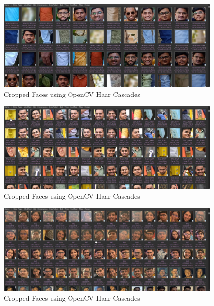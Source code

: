\documentclass[openany]{report}
\begin{document}
\begin{figure}[H]
    \centering
    \includegraphics[width=.95\textwidth]{imgs/Cropped images.png}
    \caption{Cropped Faces using OpenCV Haar Cascades}
\end{figure}

\begin{figure}[H]
    \centering
    \includegraphics[width=.95\textwidth]{imgs/Copped images 2.png}
    \caption{Cropped Faces using OpenCV Haar Cascades}
\end{figure}

\begin{figure}[H]
    \centering
    \includegraphics[width=.95\textwidth]{imgs/Copped images 3.png}
    \caption{Cropped Faces using OpenCV Haar Cascades}
\end{figure}
\end{document}
